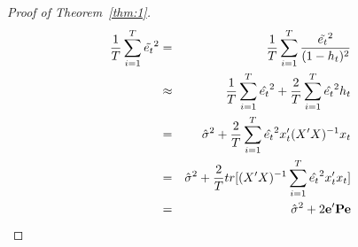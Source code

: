 \documentclass[a4paper,12pt]{article}
\begin{document}
\begin{proof}[Proof of Theorem~\ref{thm:1}]
\begin{eqnarray}
\frac{1}{T} \sum_{i=1}^T \tilde{e_t}^2 & = & \frac{1}{T} \sum_{i=1}^T \frac{\tilde{e_t}^2}{(1-h_t)^2} \nonumber \\
                                        & \approx & \frac{1}{T} \sum_{i=1}^T \hat{e_t}^2 + \frac{2}{T} \sum_{i=1}^T \hat{e_t}^2 h_t \nonumber \\
                                        & = & \hat{\sigma}^2 + \frac{2}{T} \sum_{i=1}^T \hat{e_t}^2 x_t' (X'X)^{-1} x_t \nonumber \\
                                        & = & \hat{\sigma}^2 + \frac{2}{T} tr[(X'X)^{-1} \sum_{i=1}^T \hat{e_t}^2 x_t'x_t] \nonumber \\
                                        & = & \hat{\sigma}^2 + 2 \bold{e}' \bold{P} \bold{e}
\end{eqnarray}
\end{proof}
\end{document}
